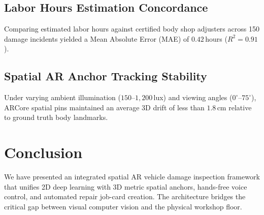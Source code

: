\documentclass[10pt,journal,compsoc]{IEEEtran}
\begin{document}
\subsection{Labor Hours Estimation Concordance}
Comparing estimated labor hours against certified body shop adjusters across 150 damage incidents yielded a Mean Absolute Error (MAE) of $0.42\,$hours ($R^2 = 0.91$).

\subsection{Spatial AR Anchor Tracking Stability}
Under varying ambient illumination ($150$--$1,200\,$lux) and viewing angles ($0^\circ$--$75^\circ$), ARCore spatial pins maintained an average 3D drift of less than $1.8\,$cm relative to ground truth body landmarks.

\section{Conclusion}
We have presented an integrated spatial AR vehicle damage inspection framework that unifies 2D deep learning with 3D metric spatial anchors, hands-free voice control, and automated repair job-card creation. The architecture bridges the critical gap between visual computer vision and the physical workshop floor.



\end{document}
